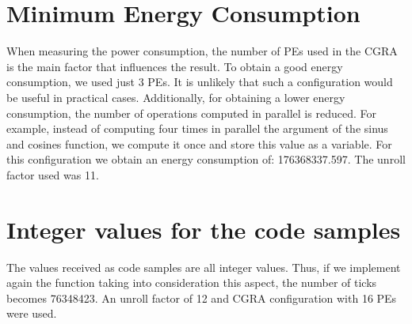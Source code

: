 	\section{Minimum Energy Consumption} %
	\label{sec:impl_min_energy}
		When measuring the power consumption, the number of PEs used in the CGRA is the main factor that influences the result. To obtain a good energy consumption, we used just \num{3} PEs. It is unlikely that such a configuration would be useful in practical cases. Additionally, for obtaining a lower energy consumption, the number of operations computed in parallel is reduced. For example, instead of computing four times in parallel the argument of the sinus and cosines function, we compute it once and store this value as a variable. For this configuration we obtain an energy consumption of: \num{176368337.597}. The unroll factor used was \num{11}.
	
	\section{Integer values for the code samples} %
	\label{sec:impl_int}
		The values received as code samples are all integer values. Thus, if we implement again the function taking into consideration this aspect, the number of ticks becomes \num{76348423}. An unroll factor of \num{12} and CGRA configuration with \num{16} PEs were used. 
